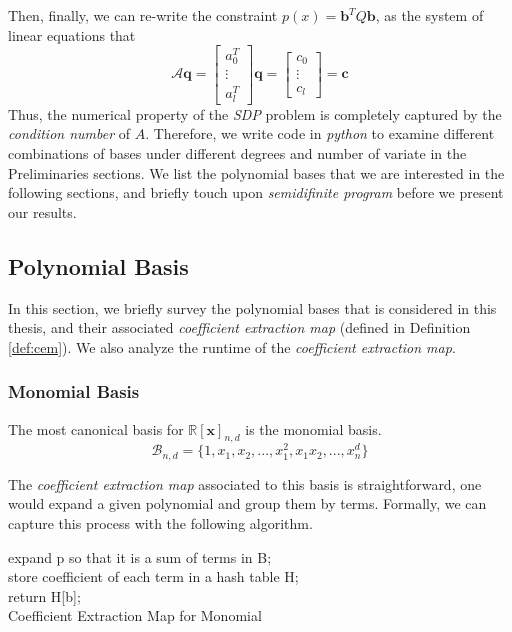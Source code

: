 \documentclass[12pt]{amsart}
\numberwithin{equation}{section}
\theoremstyle{definition}
\numberwithin{thm}{section}
\begin{document}
\smallskip
Then, finally, we can re-write the constraint $p(x) = \mathbf{b}^T Q \mathbf{b}$, as the system of linear equations that 
\begin{equation*}
     \mathcal{A} \mathbf{q} = \begin{bmatrix}
          a_0^T \\
          \vdots \\
          a_l^T
     \end{bmatrix} \mathbf{q} = \begin{bmatrix}
          c_0 \\
          \vdots \\
          c_l
     \end{bmatrix} = \mathbf{c}
\end{equation*}
Thus, the numerical property of the \emph{SDP} problem is completely captured by the \emph{condition number} of $A$. 
Therefore, we write code in \emph{python} to examine different combinations of bases under different degrees and number of variate in the Preliminaries sections. 
We list the polynomial bases that we are interested in the following sections, and briefly touch upon \emph{semidifinite program} before we present our results.

\subsection{Polynomial Basis}
\label{Sec:polynomial Basis}
In this section, we briefly survey the polynomial bases that is considered in this thesis,
and their associated \emph{coefficient extraction map} (defined in Definition \ref{def:cem}).
We also analyze the runtime of the \emph{coefficient extraction map}.

\subsubsection{Monomial Basis}
The most canonical basis for $\mathbb{R}[\mathbf{x}]_{n, d}$ is the monomial basis. 
\begin{equation*}
     \mathcal{B}_{n, d} = \{1, x_1, x_2, ..., x_1^2, x_1 x_2, ..., x_n^d\}
\end{equation*}

The \emph{coefficient extraction map} associated to this basis is straightforward, 
one would expand a given polynomial and group them by terms. Formally, we can capture this process with the following algorithm.

\begin{algorithm}[H]
     \SetAlgoLined
     expand p so that it is a sum of terms in B;\\
     store coefficient of each term in a hash table H;\\
     return H[b];\\
     \caption{Coefficient Extraction Map for Monomial}
\end{algorithm}
\end{document}
